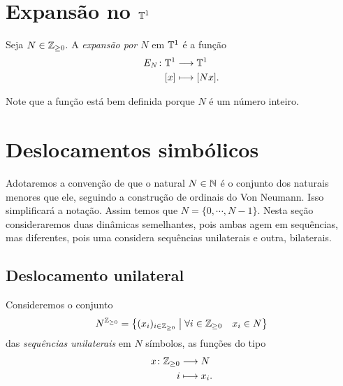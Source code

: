 
\section{Expansão no \texorpdfstring{$\mathbb{T}^1$}{toro 1 dimensional}}

\begin{definition}
Seja $N \in \mathbb{Z}_{\geq 0}$. A \emph{expansão por $N$} em $\mathbb{T}^1$ é a função
	\begin{align*}
	{E_N}\colon {\mathbb{T}^1} &\longrightarrow {\mathbb{T}^1} \\{[x]} &\longmapsto [Nx].
	\end{align*}
\end{definition}

Note que a função está bem definida porque $N$ é um número inteiro.


\section{Deslocamentos simbólicos}

Adotaremos a convenção de que o natural $N \in \mathbb{N}$ é o conjunto dos naturais menores que ele, seguindo a construção de ordinais do Von Neumann. Isso simplificará a notação. Assim temos que $N = \{0,\cdots,N-1\}$. Nesta seção consideraremos duas dinâmicas semelhantes, pois ambas agem em sequências, mas diferentes, pois uma considera sequências unilaterais e outra, bilaterais.

\subsection{Deslocamento unilateral}

Consideremos o conjunto
	\begin{equation*}
	N^{\mathbb{Z}_{\geq 0}} = \left\{{(x_i)_{i \in \mathbb{Z}_{\geq 0}}}\;\middle\vert\;{\forall i \in \mathbb{Z}_{\geq 0} \quad x_i \in N}\right\}
	\end{equation*}
das \emph{sequências unilaterais} em $N$ símbolos, as funções do tipo
	\begin{align*}
	{x}\colon {\mathbb{Z}_{\geq 0}} &\longrightarrow {N} \\{i} &\longmapsto x_i.
	\end{align*}

